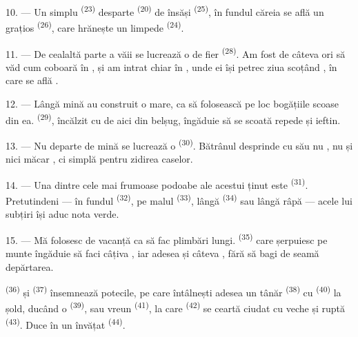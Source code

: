 10. --- Un simplu  \textsuperscript{(23)} desparte
 \textsuperscript{(20)} de  însăși
\textsuperscript{(25)}, în fundul căreia se află un  grațios
\textsuperscript{(26)}, care hrănește un  limpede
\textsuperscript{(24)}.

11. --- De cealaltă parte a văii se lucrează o  de fier
\textsuperscript{(28)}. Am fost de câteva ori să văd cum coboară 
în , și am intrat chiar în , unde ei își petrec ziua
scoțând , în care se află .

12. --- Lângă mină au construit o  mare, ca să folosească pe
loc bogățiile scoase din ea.  \textsuperscript{(29)}, încălzit cu
 de aici din belșug, îngăduie să se scoată 
repede și ieftin.

13. --- Nu departe de mină se lucrează o  \textsuperscript{(30)}.
Bătrânul  desprinde cu  său nu
, nu  și nici măcar , ci simplă
 pentru zidirea caselor.

14. --- Una dintre cele mai frumoase podoabe ale acestui ținut este 
\textsuperscript{(31)}. Pretutindeni --- în fundul 
\textsuperscript{(32)}, pe malul  \textsuperscript{(33)}, lângă
 \textsuperscript{(34)} sau lângă râpă --- acele lui subțiri își
aduc nota verde.

\VUsaut{3.0mm}
\VUsaut{3.0mm}

15. --- Mă folosesc de vacanță ca să fac plimbări lungi. 
\textsuperscript{(35)} care șerpuiesc pe munte îngăduie să faci câțiva
, iar adesea și câteva , fără să bagi de seamă
depărtarea.

 \textsuperscript{(36)} și 
\textsuperscript{(37)} însemnează potecile, pe care întâlnești adesea un tânăr
 \textsuperscript{(38)} cu  \textsuperscript{(40)}
la șold, ducând o  \textsuperscript{(39)}, sau vreun
 \textsuperscript{(41)}, la care 
\textsuperscript{(42)} se ceartă ciudat cu  veche și ruptă
\textsuperscript{(43)}. Duce în  un  învățat
\textsuperscript{(44)}.

